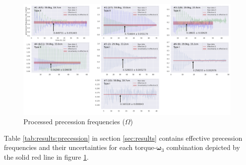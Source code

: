 \begin{figure}[!ht]
  \centering
  \includegraphics[width=\textwidth]{gyroscope/images/processed_precession}
  \caption{Processed precession frequencies ($\Omega$) }  
  \label{fig:results:processed_precession}
\end{figure}

\begin{multicols}{2}
Table \ref{tab:results:precession} in section \ref{sec:results} contains effective precession frequencies and their uncertainties for each torque-$\boldsymbol\omega_{3}$ combination depicted by the solid red line in figure \ref{fig:results:processed_precession}.
\end{multicols}
